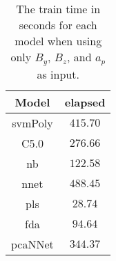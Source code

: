 \begin{table}[!ht]
	\centering
	\begin{tabular}{|c|c|}
		\hline
		Model & elapsed \\ \hline
		svmPoly & $415.70$ \\ \hline
		C5.0 & $276.66$ \\ \hline
		nb & $122.58$ \\ \hline
		nnet & $488.45$ \\ \hline
		pls & $28.74$ \\ \hline
		fda & $94.64$ \\ \hline
		pcaNNet & $344.37$ \\ \hline
	\end{tabular}
	\caption{The train time in seconds for each model when using only $B_{y}$, $B_{z}$, and $a_{p}$ as input.}
	\label{tab:time:yzap:train}
\end{table}
